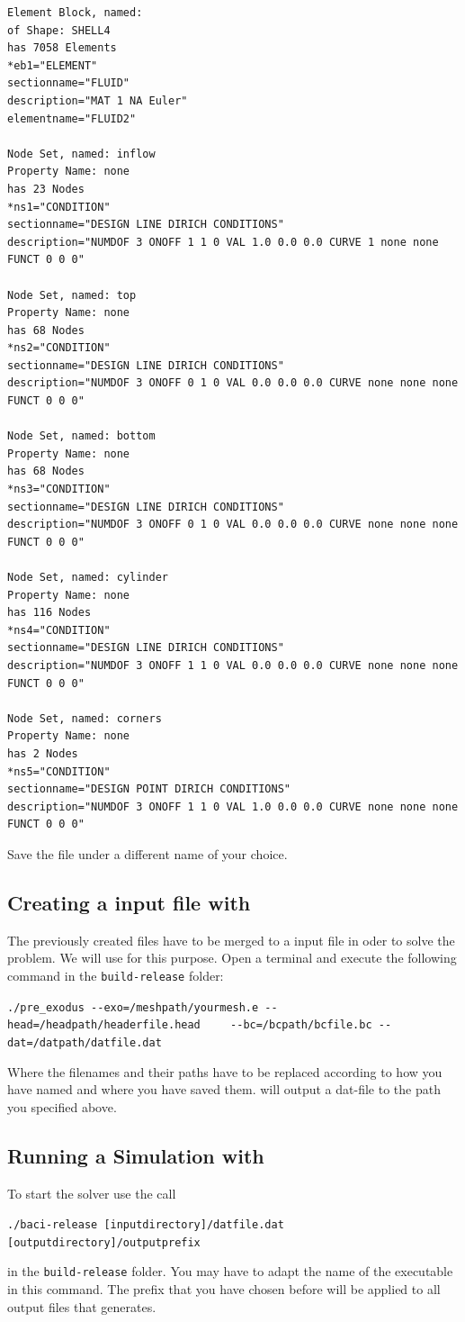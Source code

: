  \begin{small} \begin{verbatim}
Element Block, named: 
of Shape: SHELL4
has 7058 Elements
*eb1="ELEMENT"
sectionname="FLUID"
description="MAT 1 NA Euler"
elementname="FLUID2"

Node Set, named: inflow
Property Name: none
has 23 Nodes
*ns1="CONDITION"
sectionname="DESIGN LINE DIRICH CONDITIONS"
description="NUMDOF 3 ONOFF 1 1 0 VAL 1.0 0.0 0.0 CURVE 1 none none FUNCT 0 0 0"

Node Set, named: top
Property Name: none
has 68 Nodes
*ns2="CONDITION"
sectionname="DESIGN LINE DIRICH CONDITIONS"
description="NUMDOF 3 ONOFF 0 1 0 VAL 0.0 0.0 0.0 CURVE none none none FUNCT 0 0 0"

Node Set, named: bottom
Property Name: none
has 68 Nodes
*ns3="CONDITION"
sectionname="DESIGN LINE DIRICH CONDITIONS"
description="NUMDOF 3 ONOFF 0 1 0 VAL 0.0 0.0 0.0 CURVE none none none FUNCT 0 0 0"

Node Set, named: cylinder
Property Name: none
has 116 Nodes
*ns4="CONDITION"
sectionname="DESIGN LINE DIRICH CONDITIONS"
description="NUMDOF 3 ONOFF 1 1 0 VAL 0.0 0.0 0.0 CURVE none none none FUNCT 0 0 0"

Node Set, named: corners
Property Name: none
has 2 Nodes
*ns5="CONDITION"
sectionname="DESIGN POINT DIRICH CONDITIONS"
description="NUMDOF 3 ONOFF 1 1 0 VAL 1.0 0.0 0.0 CURVE none none none FUNCT 0 0 0"
 \end{verbatim} \end{small}
Save the file under a different name of your choice.

\subsection{Creating a \baci{} input file with \prexo}
The previously created files have to be merged to a \baci{} input file in oder 
to solve the problem. We will use \prexo for this purpose. Open a terminal 
and execute the following command in the \texttt{build-release} folder:
\begin{center}
  \verb|./pre_exodus --exo=/meshpath/yourmesh.e --head=/headpath/headerfile.head|
  \verb|	--bc=/bcpath/bcfile.bc --dat=/datpath/datfile.dat|
\end{center}
Where the filenames and their paths have to be replaced according to how you have named and where you have saved them.
\prexo will output a dat-file to the path you specified above.


\subsection{Running a Simulation with \baci{}}
\label{tut_fluid_preexo:baci}
To start the solver use the call 
\begin{center}
	\verb|./baci-release [inputdirectory]/datfile.dat [outputdirectory]/outputprefix|
\end{center}
in the \texttt{build-release} folder. You may have to adapt the name of the executable 
in this command. The prefix that you have chosen before will 
be applied to all output files that \baci{} generates.


